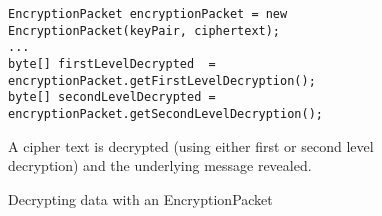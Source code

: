 \begin{figure}[H]
  \centering
  \begin{verbatim}
EncryptionPacket encryptionPacket = new EncryptionPacket(keyPair, ciphertext);
...
byte[] firstLevelDecrypted  = encryptionPacket.getFirstLevelDecryption();
byte[] secondLevelDecrypted = encryptionPacket.getSecondLevelDecryption();
  \end{verbatim}
  \caption{
  	Decrypting data with an EncryptionPacket
  }{
  	A cipher text is decrypted (using either first or second level decryption) and the underlying message revealed.
  }
  \label{code:encryption_packet_decryption}
\end{figure}
